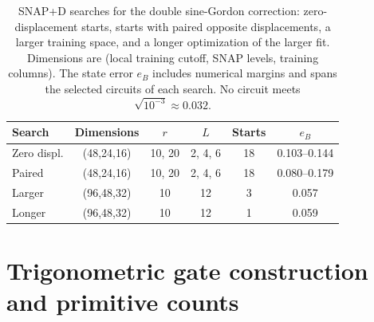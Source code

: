 \documentclass[pra,twocolumn,superscriptaddress,nofootinbib,floatfix]{revtex4-2}
\theoremstyle{remark}
\newcommand{\revcolor}{\color{blue}}
\DeclareRobustCommand{\rev}[1]{{\revcolor #1}}
\begin{document}
\begin{table}[t]
\revcolor
\caption{SNAP+D searches for the double sine-Gordon correction: zero-displacement starts, starts with paired opposite displacements, a larger training space, and a longer optimization of the larger fit. Dimensions are (local training cutoff, SNAP levels, training columns). The state error \(e_B\) includes numerical margins and spans the selected circuits of each search. No circuit meets \(\sqrt{10^{-3}}\approx0.032\).}
\label{tab:dsg-snap}
\begin{ruledtabular}
\begin{tabular}{lccccc}
Search & Dimensions & \(r\) & \(L\) & Starts & \(e_B\) \\
\hline
Zero displ. & (48,24,16) & 10, 20 & 2, 4, 6 & 18 & 0.103--0.144 \\
Paired & (48,24,16) & 10, 20 & 2, 4, 6 & 18 & 0.080--0.179 \\
Larger & (96,48,32) & 10 & 12 & 3 & 0.057 \\
Longer & (96,48,32) & 10 & 12 & 1 & 0.059 \\
\end{tabular}
\end{ruledtabular}
\end{table}

\section{\rev{Trigonometric gate construction and primitive counts}}
\label{app:trig}
\end{document}
